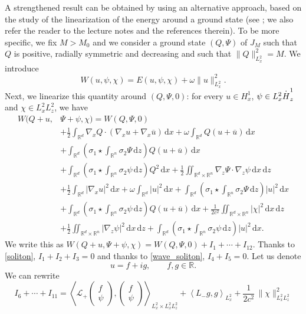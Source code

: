 \documentclass[11pt]{article}
\let\oldbar\bar\let\oldhat\hat\let\oldtilde\tilde
\let\bar\oldbar
\let\hat\oldhat
\let\tilde\oldtilde
\DeclareRobustCommand{\accentset}[2]{\overset{#1}{#2}}
\theoremstyle{definition}
\newcommand*{\overbigdot}[1]{%
\accentset{\mbox{\large\bfseries .}}{#1}}
\let\bar\overline
\let\hat\widehat
\let\tilde\widetilde
\newcommand{\R}{\mathbb{R}}
\let\ds\displaystyle
\newcommand{\ud}{\, {\mathrm{d}}}
\begin{document}
A strengthened result can be obtained by using an alternative approach, based on the study of the linearization of the energy around a ground state (see
\cite{MaMe,Weinstein1,Weinstein2}; we also refer the reader to the lecture notes \cite[\S 2.6]{Martel} and the references therein). To be more specific, we fix $M>M_{0}$ and we consider a ground state $(Q,\Psi)$ of $J_{M}$ such that $Q$ is positive, radially symmetric and decreasing and such that $\|Q\|_{L_{x}^{2}}^{2}=M$. We introduce
\[
W(u,\psi,\chi)=E(u,\psi,\chi)+\omega\|u\|_{L_{x}^{2}}^{2}.
\]
Next, we linearize this quantity around $(Q,\Psi,0)$: for every $u\in H_{x}^{1}$, $\psi\in L_{x}^{2}\overbigdot{H}_{z}^{1}$ and $\chi\in L_{x}^{2}L_{z}^{2}$, we have\vspace*{-3pt}
\begin{align*}
\ds W(Q+u,&\Psi+\psi,\chi)=W(Q,\Psi,0)\\
&+ \ds \frac{1}{2}\int_{\R^{d}}\nabla_{x}Q\cdot(\nabla_{x}u+\nabla_{x}\bar{u})\ud x+\omega\int_{\R^{d}}Q(u+\bar{u})\ud x
\\
&+\ds\int_{\R^{d}}\left(\sigma_{1}\star\int_{\R^{n}}\sigma_{2}\Psi\ud z\right)Q(u+\bar{u})\ud x
\\
&+\ds\int_{\R^{d}}\left(\sigma_{1}\star\int_{\R^{n}}\sigma_{2}\psi\ud z\right)Q^{2}\ud x+\frac{1}{2}\iint_{\R^{d}\times\R^{n}}\nabla_{z}\Psi\cdot\nabla_{z}\psi\ud x\ud z
\\
&\ds +\frac{1}{2}\int_{\R^{d}}|\nabla_{x}u|^{2}\ud x+\omega\int_{\R^{d}}|u|^{2}\ud x+\int_{\R^{d}}\left(\sigma_{1}\star\int_{\R^{n}}\sigma_{2}\Psi\ud z\right)|u|^{2}\ud x\\
&\ds +\int_{\R^{d}}\left(\sigma_{1}\star\int_{\R^{n}}\sigma_{2}\psi\ud z\right)Q(u+\bar{u})\ud x+\frac{1}{2c^{2}}\iint_{\R^{d}\times\R^{n}}|\chi|^{2}\ud x\ud z
\\
&+\ds\frac{1}{2}\iint_{\R^{d}\times\R^{n}}|\nabla_{z}\psi|^{2}\ud x\ud z
+ \ds \int_{\R^{d}}\left(\sigma_{1}\star\int_{\R^{n}}\sigma_{2}\psi\ud z\right)|u|^{2}\ud x.
\end{align*}
We write this as $W(Q+u,\Psi+\psi,\chi)=W(Q,\Psi,0)+I_1+\cdots+I_{12}$.
Thanks to \eqref{soliton}, $I_1+I_2+I_3=0$ and thanks to \eqref{wave_soliton}, $I_4+I_5=0$. Let us denote\vspace*{-3pt}
\[
u=f+i g,\qquad f,g\in \mathbb R.
\]
We can rewrite\vspace*{-3pt}
\[
I_ 6+\cdots+I_{11}= \left\langle\mathcal{L}_{+}\begin{pmatrix} f\\\psi \end{pmatrix},\begin{pmatrix} f\\\psi \end{pmatrix}\right\rangle_{L_{x}^{2}\times L_{x}^{2}L_{z}^{2}}+\left\langle L_{-}g,g\right\rangle_{L_{x}^{2}}+\frac{1}{2c^{2}}\,\|\chi\|_{L_{x}^{2}L_{z}^{2}}^{2}
\]
\end{document}
